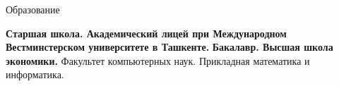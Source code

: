 \begin{rubric}{Образование}

\entry*[2016 -- 2019]%
	\textbf{Старшая школа. Академический лицей при Международном Вестминстерском университете в Ташкенте.} 
%
\entry*[2019 -- 2023]%
	\textbf{Бакалавр. Высшая школа экономики.} Факультет компьютерных наук. Прикладная математика и информатика.\par
\end{rubric}